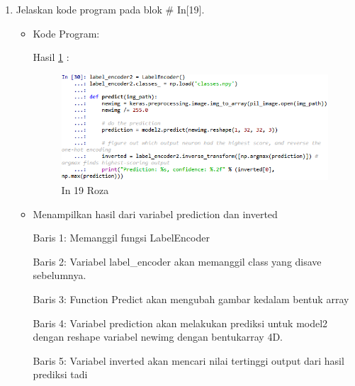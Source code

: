 \begin{enumerate}
\item Jelaskan kode program pada blok \# In[19].
\begin{itemize}
\item Kode Program:

\par Hasil \ref{in19roza} :
\begin{figure}[!hbtp]
\centering
\includegraphics[scale=0.7]{figures/prak19roza.png}
\caption{In 19 Roza}
\label{in19roza}
\end{figure}
\item Menampilkan hasil dari variabel prediction dan inverted
\par Baris 1: Memanggil fungsi LabelEncoder
\par Baris 2: Variabel label\_encoder akan memanggil class yang disave sebelumnya.
\par Baris 3: Function Predict akan mengubah gambar kedalam bentuk array
\par Baris 4: Variabel prediction akan melakukan prediksi untuk model2 dengan reshape variabel newimg dengan bentukarray 4D.
\par Baris 5: Variabel inverted akan mencari nilai tertinggi output dari hasil prediksi tadi
\end{itemize}
\par


\end{enumerate}
